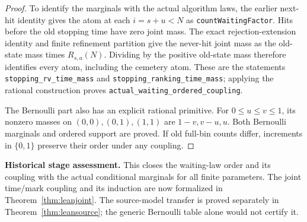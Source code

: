 \documentclass[11pt]{article}
\begin{document}
\begin{proof}
To identify the marginals with the actual algorithm laws, the earlier
next-hit identity gives the atom at each $i=s+u<N$ as
\texttt{countWaitingFactor}. Hits before the old stopping time have
zero joint mass. The exact rejection-extension identity and finite
refinement partition give the never-hit joint mass as the old-state
mass times $R_{s,a}(N)$. Dividing by the positive old-state mass
therefore identifies every atom, including the cemetery atom.
These are the statements \texttt{stopping\_rv\_time\_mass} and
\texttt{stopping\_ranking\_time\_mass}; applying the rational
construction proves \texttt{actual\_waiting\_ordered\_coupling}.

The Bernoulli part also has an explicit rational primitive. For
$0\leq u\leq v\leq1$, its nonzero masses on $(0,0),(0,1),(1,1)$
are $1-v,v-u,u$. Both Bernoulli marginals and ordered support are
proved. If old full-bin counts differ, increments in $\{0,1\}$
preserve their order under any coupling.
\end{proof}

\noindent\textbf{Historical stage assessment.}
This closes the waiting-law order and its coupling with the actual
conditional marginals for all finite parameters. The joint time/mark coupling and its induction are now formalized in
Theorem~\ref{thm:leanjoint}. The source-model transfer is proved separately
in Theorem~\ref{thm:leansource}; the generic Bernoulli table alone would
not certify it.
\end{document}

